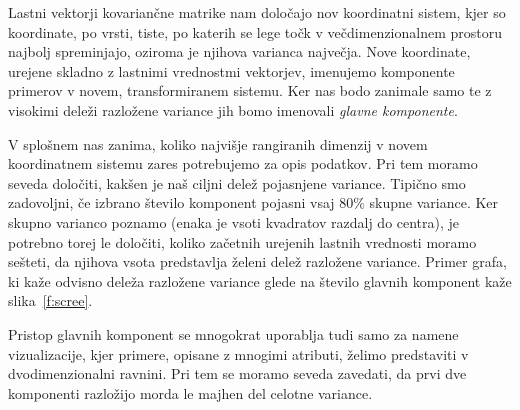 Lastni vektorji kovariančne matrike nam določajo nov koordinatni
sistem, kjer so koordinate, po vrsti, tiste, po katerih se lege točk v
večdimenzionalnem prostoru najbolj spreminjajo, oziroma je njihova
varianca največja. Nove koordinate, urejene skladno z lastnimi vrednostmi vektorjev, imenujemo komponente primerov v novem, transformiranem sistemu. Ker nas bodo zanimale samo te z visokimi deleži razložene variance jih bomo imenovali {\em glavne komponente}.

\begin{figure}[htbp]
\end{figure}

V splošnem nas zanima, koliko najvišje rangiranih dimenzij v novem
koordinatnem sistemu zares potrebujemo za opis podatkov. Pri tem moramo
seveda določiti, kakšen je naš ciljni delež pojasnjene variance. Tipično
smo zadovoljni, če izbrano število komponent pojasni vsaj $80\%$ skupne variance. Ker skupno varianco poznamo (enaka je vsoti kvadratov razdalj do
centra), je potrebno torej le določiti, koliko začetnih urejenih lastnih
vrednosti moramo sešteti, da njihova vsota predstavlja želeni delež razložene variance. Primer grafa, ki kaže odvisno deleža razložene variance glede na število glavnih komponent kaže slika~\ref{f:scree}.

Pristop glavnih komponent se mnogokrat uporablja tudi samo za namene vizualizacije, kjer primere, opisane z mnogimi atributi, želimo predstaviti v dvodimenzionalni ravnini. Pri tem se moramo seveda zavedati, da prvi dve komponenti razložijo morda le majhen del celotne variance.

